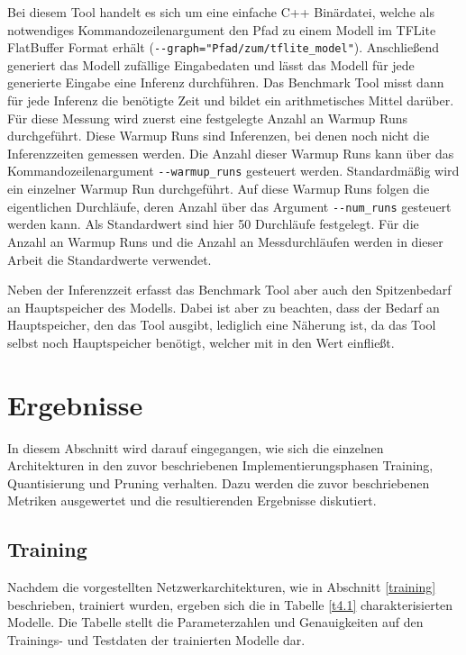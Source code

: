 Bei diesem Tool handelt es sich um eine einfache C++ Binärdatei, welche als notwendiges Kommandozeilenargument den Pfad zu einem Modell im TFLite FlatBuffer Format erhält (\lstinline{--graph="Pfad/zum/tflite_model"}). Anschließend generiert das Modell zufällige Eingabedaten und lässt das Modell für jede generierte Eingabe eine Inferenz durchführen. Das Benchmark Tool misst dann für jede Inferenz die benötigte Zeit und bildet ein arithmetisches Mittel darüber. Für diese Messung wird zuerst eine festgelegte Anzahl an Warmup Runs durchgeführt. Diese Warmup Runs sind Inferenzen, bei denen noch nicht die Inferenzzeiten gemessen werden. Die Anzahl dieser Warmup Runs kann über das Kommandozeilenargument \lstinline{--warmup_runs} gesteuert werden. Standardmäßig wird ein einzelner Warmup Run durchgeführt. Auf diese Warmup Runs folgen die eigentlichen Durchläufe, deren Anzahl über das Argument \lstinline{--num_runs} gesteuert werden kann. Als Standardwert sind hier 50 Durchläufe festgelegt. Für die Anzahl an Warmup Runs und die Anzahl an Messdurchläufen werden in dieser Arbeit die Standardwerte verwendet.

Neben der Inferenzzeit erfasst das Benchmark Tool aber auch den Spitzenbedarf an Hauptspeicher des Modells. Dabei ist aber zu beachten, dass der Bedarf an Hauptspeicher, den das Tool ausgibt, lediglich eine Näherung ist, da das Tool selbst noch Hauptspeicher benötigt, welcher mit in den Wert einfließt.



\section{Ergebnisse}
\label{ergebnisse}
In diesem Abschnitt wird darauf eingegangen, wie sich die einzelnen Architekturen in den zuvor beschriebenen Implementierungsphasen Training, Quantisierung und Pruning verhalten. Dazu werden die zuvor beschriebenen Metriken ausgewertet und die resultierenden Ergebnisse diskutiert.

\subsection{Training}
\label{eval_training}
Nachdem die vorgestellten Netzwerkarchitekturen, wie in Abschnitt \ref{training} beschrieben, trainiert wurden, ergeben sich die in Tabelle \ref{t4.1} charakterisierten Modelle. Die Tabelle stellt die Parameterzahlen und Genauigkeiten auf den Trainings- und Testdaten der trainierten Modelle dar.

